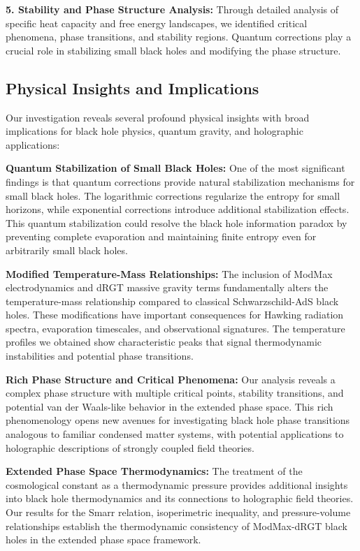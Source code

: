 \documentclass[superscriptaddress, prd, aps,amsmath,amssymb,showpacs,showkeys, onecolumn]{revtex4-2}
\begin{document}
\textbf{5. Stability and Phase Structure Analysis:} Through detailed analysis of specific heat capacity and free energy landscapes, we identified critical phenomena, phase transitions, and stability regions. Quantum corrections play a crucial role in stabilizing small black holes and modifying the phase structure.

\subsection{Physical Insights and Implications}

Our investigation reveals several profound physical insights with broad implications for black hole physics, quantum gravity, and holographic applications:

\textbf{Quantum Stabilization of Small Black Holes:} One of the most significant findings is that quantum corrections provide natural stabilization mechanisms for small black holes. The logarithmic corrections regularize the entropy for small horizons, while exponential corrections introduce additional stabilization effects. This quantum stabilization could resolve the black hole information paradox by preventing complete evaporation and maintaining finite entropy even for arbitrarily small black holes.

\textbf{Modified Temperature-Mass Relationships:} The inclusion of ModMax electrodynamics and dRGT massive gravity terms fundamentally alters the temperature-mass relationship compared to classical Schwarzschild-AdS black holes. These modifications have important consequences for Hawking radiation spectra, evaporation timescales, and observational signatures. The temperature profiles we obtained show characteristic peaks that signal thermodynamic instabilities and potential phase transitions.

\textbf{Rich Phase Structure and Critical Phenomena:} Our analysis reveals a complex phase structure with multiple critical points, stability transitions, and potential van der Waals-like behavior in the extended phase space. This rich phenomenology opens new avenues for investigating black hole phase transitions analogous to familiar condensed matter systems, with potential applications to holographic descriptions of strongly coupled field theories.

\textbf{Extended Phase Space Thermodynamics:} The treatment of the cosmological constant as a thermodynamic pressure provides additional insights into black hole thermodynamics and its connections to holographic field theories. Our results for the Smarr relation, isoperimetric inequality, and pressure-volume relationships establish the thermodynamic consistency of ModMax-dRGT black holes in the extended phase space framework.
\end{document}
